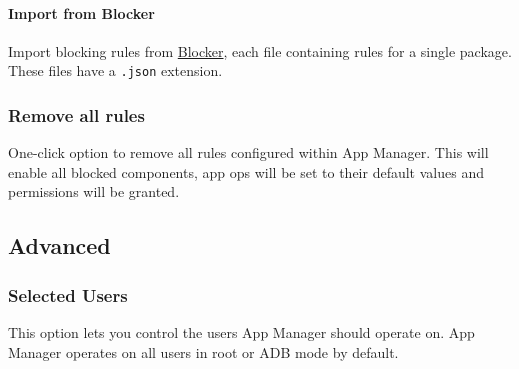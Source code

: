 \paragraph{Import from Blocker} Import blocking rules from \href{https://github.com/lihenggui/blocker}{Blocker}, each file containing rules for a single package.
These files have a \texttt{.json} extension.

\subsubsection{Remove all rules} %
One-click option to remove all rules configured within App Manager.
This will enable all blocked components, app ops will be set to their default values and permissions will be granted.


\subsection{Advanced}\label{subsec:advanced} %

\subsubsection{Selected Users}\label{subsubsec:selected-users} %
This option lets you control the users App Manager should operate on. App Manager operates on all users in root or ADB mode by default.

